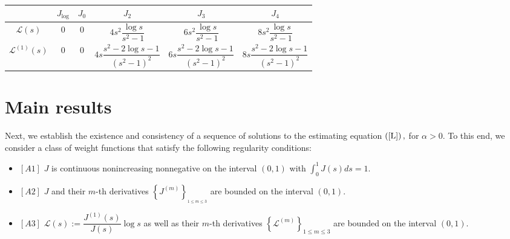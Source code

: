 \documentclass[12pt,reqno,openbib,runningheads,a4paper,portrait]{amsart}%
\begin{document}
\begin{center}%
\begin{table}[tbp] \centering
\begin{tabular}
[t]{|c|c|c|c|c|c|}\hline
& $J_{\log}$ & $J_{0}$ & $J_{2}$ & $J_{3}$ & $J_{4}$\\\hline
$\mathcal{L}\left(  s\right)  $ & $0$ & $0$ & $4s^{2}\dfrac{\log s}{s^{2}-1}$
& $6s^{2}\dfrac{\log s}{s^{2}-1}$ & $8s^{2}\dfrac{\log s}{s^{2}-1}$\\\hline
$\mathcal{L}^{\left(  1\right)  }\left(  s\right)  $ & $0$ & $0$ &
$4s\dfrac{s^{2}-2\log s-1}{\left(  s^{2}-1\right)  ^{2}}$ & $6s\dfrac
{s^{2}-2\log s-1}{\left(  s^{2}-1\right)  ^{2}}$ & $8s\dfrac{s^{2}-2\log
s-1}{\left(  s^{2}-1\right)  ^{2}}$\\\hline
\end{tabular}%
\caption{}
\label{Tab1}%
\end{table}%



\end{center}

\section{\textbf{Main results\label{sec4}}}

\noindent Next, we establish the existence and consistency of a sequence of
solutions to the estimating equation $\left(  \ref{L}\right)  ,$ for
$\alpha>0.$ To this end, we consider a class of weight functions that satisfy
the following regularity conditions:

\begin{itemize}
\item $\left[  A1\right]  $ $J$ is continuous nonincreasing nonnegative on the
interval $\left(  0,1\right)  $ with $\int_{0}^{1}J\left(  s\right)  ds=1.$

\item $\left[  A2\right]  $ $J$ and their $m$-th derivatives $\left\{
J^{\left(  m\right)  }\right\}  _{_{1\leq m\leq3}}$ are bounded on the
interval $\left(  0,1\right)  .$

\item $\left[  A3\right]  $ $\mathcal{L}\left(  s\right)  :=\dfrac{J^{\left(
1\right)  }\left(  s\right)  }{J\left(  s\right)  }\log s$ as well as their
$m$-th derivatives $\left\{  \mathcal{L}^{\left(  m\right)  }\right\}  _{1\leq
m\leq3}$ are bounded on the interval $\left(  0,1\right)  .$
\end{itemize}
\end{document}
